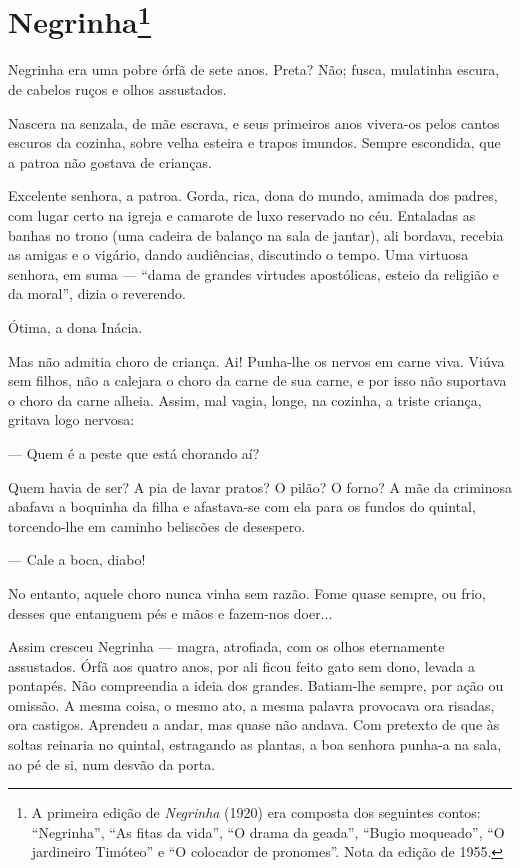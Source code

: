 \chapter{Negrinha\footnote{A primeira edição
  de \emph{Negrinha} (1920) era composta dos seguintes contos:
  ``Negrinha'', ``As fitas da vida'', ``O drama da geada'', ``Bugio
  moqueado'', ``O jardineiro Timóteo'' e ``O colocador de pronomes''.
  Nota da edição de 1955.}}

Negrinha era uma pobre órfã de sete anos. Preta? Não; fusca, mulatinha
escura, de cabelos ruços e olhos assustados.

Nascera na senzala, de mãe escrava, e seus primeiros anos vivera-os
pelos cantos escuros da cozinha, sobre velha esteira e trapos imundos.
Sempre escondida, que a patroa não gostava de crianças.

Excelente senhora, a patroa. Gorda, rica, dona do mundo, amimada dos
padres, com lugar certo na igreja e camarote de luxo reservado no céu.
Entaladas as banhas no trono (uma cadeira de balanço na sala de jantar),
ali bordava, recebia as amigas e o vigário, dando audiências, discutindo
o tempo. Uma virtuosa senhora, em suma --- ``dama de grandes virtudes
apostólicas, esteio da religião e da moral'', dizia o reverendo.

Ótima, a dona Inácia.

Mas não admitia choro de criança. Ai! Punha-lhe os nervos em carne viva.
Viúva sem filhos, não a calejara o choro da carne de sua carne, e por
isso não suportava o choro da carne alheia. Assim, mal vagia, longe, na
cozinha, a triste criança, gritava logo nervosa:

--- Quem é a peste que está chorando aí?

Quem havia de ser? A pia de lavar pratos? O pilão? O forno? A mãe da
criminosa abafava a boquinha da filha e afastava-se com ela para os
fundos do quintal, torcendo-lhe em caminho beliscões de desespero.

--- Cale a boca, diabo!

No entanto, aquele choro nunca vinha sem razão. Fome quase sempre, ou
frio, desses que entanguem pés e mãos e fazem-nos doer...

Assim cresceu Negrinha --- magra, atrofiada, com os olhos eternamente
assustados. Órfã aos quatro anos, por ali ficou feito gato sem dono,
levada a pontapés. Não compreendia a ideia dos grandes. Batiam-lhe
sempre, por ação ou omissão. A mesma coisa, o mesmo ato, a mesma palavra
provocava ora risadas, ora castigos. Aprendeu a andar, mas quase não
andava. Com pretexto de que às soltas reinaria no quintal, estragando as
plantas, a boa senhora punha-a na sala, ao pé de si, num desvão da
porta.

